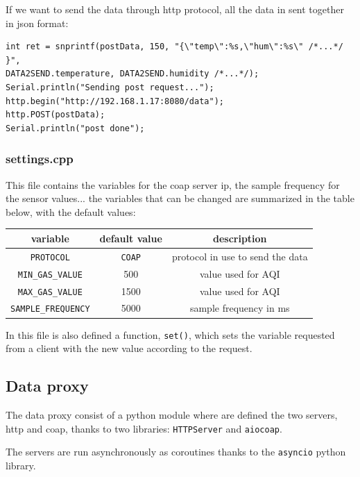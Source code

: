 \documentclass[]{article}
\begin{document}
If we want to send the data through http protocol, all the data in sent together in json format:

\begin{lstlisting}[style=C++, caption=an http request contains all the data (omitted for simplicity)]
int ret = snprintf(postData, 150, "{\"temp\":%s,\"hum\":%s\" /*...*/ }",
DATA2SEND.temperature, DATA2SEND.humidity /*...*/);
Serial.println("Sending post request...");
http.begin("http://192.168.1.17:8080/data");
http.POST(postData);
Serial.println("post done");
\end{lstlisting}

\subsubsection{settings.cpp}
This file contains the variables for the coap server ip, the sample frequency for the sensor values... the variables that can be changed are summarized in the table below, with the default values:

\begin{center}
	\begin{tabular}{|c|c|c|}
		\hline
		\textbf{variable} & \textbf{default value} & \textbf{description} \\
		\hline
		\texttt{PROTOCOL} & \texttt{COAP} & protocol in use to send the data \\
		\hline
		\texttt{MIN\_GAS\_VALUE} & 500 & value used for AQI \\
		\hline
		\texttt{MAX\_GAS\_VALUE} & 1500 & value used for AQI \\
		\hline
		\texttt{SAMPLE\_FREQUENCY} & 5000 & sample frequency in ms \\
		\hline
	\end{tabular}
\end{center}

In this file is also defined a function, \texttt{set()}, which sets the variable requested from a client with the new value according to the request. 

\subsection{Data proxy}

The data proxy consist of a python module where are defined the two servers, http and coap, thanks to two libraries: \texttt{HTTPServer} and \texttt{aiocoap}.

The servers are run asynchronously as coroutines thanks to the \texttt{asyncio} python library. 
\end{document}
